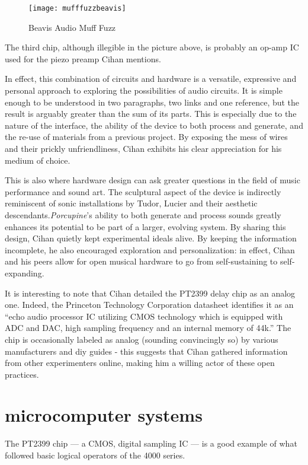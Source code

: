 	\begin{figure}[h!]
	  \caption{Beavis Audio Muff Fuzz}
	  \centering
	    \texttt{[image: mufffuzzbeavis]}
	\end{figure}
	
The third chip, although illegible in the picture above, is probably an op-amp IC used for the piezo preamp Cihan mentions. 

In effect, this combination of circuits and hardware is a versatile, expressive and personal approach to exploring the possibilities of audio circuits. It is simple enough to be understood in two paragraphs, two links and one reference, but the result is arguably greater than the sum of its parts. This is especially due to the nature of the interface, the ability of the device to both process and generate, and the re-use of materials from a previous project. By exposing the mess of wires and their prickly unfriendliness, Cihan exhibits his clear appreciation for his medium of choice.

This is also where hardware design can ask greater questions in the field of music performance and sound art. The sculptural aspect of the device is indirectly reminiscent of sonic installations by Tudor, Lucier and their aesthetic descendants.\emph{Porcupine}'s ability to both generate and process sounds greatly enhances its potential to be part of a larger, evolving system. By sharing this design, Cihan quietly kept experimental ideals alive. By keeping the information incomplete, he also encouraged exploration and personalization: in effect, Cihan and his peers allow for open musical hardware to go from self-sustaining to self-expanding. 

It is interesting to note that Cihan detailed the PT2399 delay chip as an analog one. Indeed, the Princeton Technology Corporation datasheet identifies it as an ``echo audio processor IC utilizing CMOS technology which is equipped with ADC and DAC, high sampling frequency and an internal memory of 44k.'' \citep{princetonpt} The chip is occasionally labeled as analog (sounding convincingly so) by various manufacturers and diy guides - this suggests that Cihan gathered information from other experimenters online, making him a willing actor of these open practices. 
 
\section{microcomputer systems}

The PT2399 chip — a CMOS, digital sampling IC — is a good example of what followed basic logical operators of the 4000 series. 

